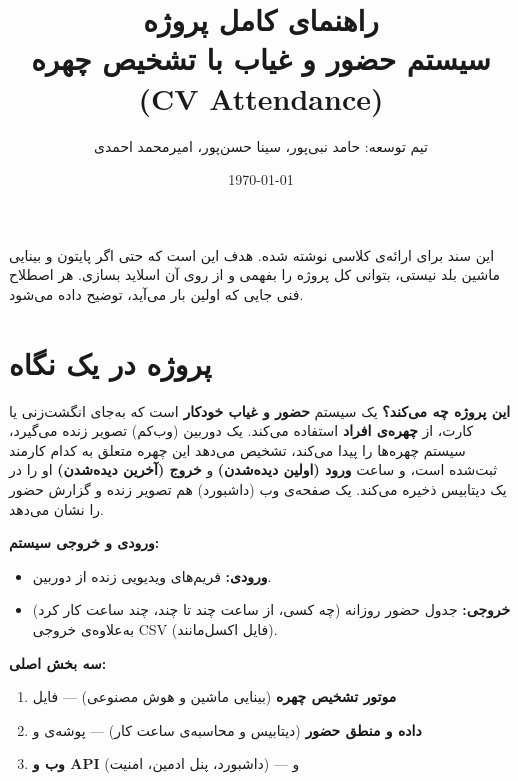\documentclass[12pt,a4paper]{article}
\title{\vspace{-1cm}\textbf{راهنمای کامل پروژه\\ سیستم حضور و غیاب با تشخیص چهره (CV Attendance)}}
\author{تیم توسعه: حامد نبی‌پور، سینا حسن‌پور، امیرمحمد احمدی}
\date{\today}
\begin{document}
\maketitle

\begin{note}
این سند برای ارائه‌ی کلاسی نوشته شده. هدف این است که حتی اگر پایتون و بینایی ماشین بلد نیستی، بتوانی کل پروژه را بفهمی و از روی آن اسلاید بسازی. هر اصطلاح فنی جایی که اولین بار می‌آید، توضیح داده می‌شود.
\end{note}

\tableofcontents
\newpage

\section{پروژه در یک نگاه}

\textbf{این پروژه چه می‌کند؟}
یک سیستم \textbf{حضور و غیاب خودکار} است که به‌جای انگشت‌زنی یا کارت، از \textbf{چهره‌ی افراد} استفاده می‌کند. یک دوربین (وب‌کم) تصویر زنده می‌گیرد، سیستم چهره‌ها را پیدا می‌کند، تشخیص می‌دهد این چهره متعلق به کدام کارمند ثبت‌شده است، و ساعت \textbf{ورود (اولین دیده‌شدن)} و \textbf{خروج (آخرین دیده‌شدن)} او را در یک دیتابیس ذخیره می‌کند. یک صفحه‌ی وب (داشبورد) هم تصویر زنده و گزارش حضور را نشان می‌دهد.

\textbf{ورودی و خروجی سیستم:}
\begin{itemize}[rightmargin=0pt]
  \item \textbf{ورودی:} فریم‌های ویدیویی زنده از دوربین.
  \item \textbf{خروجی:} جدول حضور روزانه (چه کسی، از ساعت چند تا چند، چند ساعت کار کرد) به‌علاوه‌ی خروجی CSV (فایل اکسل‌مانند).
\end{itemize}

\textbf{سه بخش اصلی:}
\begin{enumerate}[rightmargin=0pt]
  \item \textbf{موتور تشخیص چهره} (بینایی ماشین و هوش مصنوعی) — فایل 
  \item \textbf{داده و منطق حضور} (دیتابیس و محاسبه‌ی ساعت کار) — پوشه‌ی  و 
  \item \textbf{وب و API} (داشبورد، پنل ادمین، امنیت) —  و 
\end{enumerate}

\end{document}

